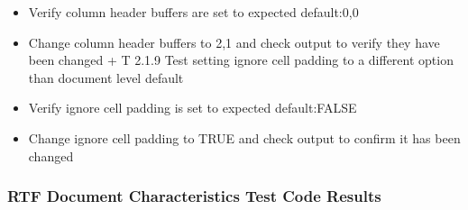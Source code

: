 \documentclass[]{article}
\providecommand{\tightlist}{%
  \setlength{\itemsep}{0pt}\setlength{\parskip}{0pt}}
\begin{document}
\begin{itemize}
\begin{itemize}
\begin{itemize}
      \begin{itemize}
      \tightlist
      \item
        Verify column header buffers are set to expected default:0,0
      \item
        Change column header buffers to 2,1 and check output to verify
        they have been changed + T 2.1.9 Test setting ignore cell
        padding to a different option than document level default
      \item
        Verify ignore cell padding is set to expected default:FALSE
      \item
        Change ignore cell padding to TRUE and check output to confirm
        it has been changed
      \end{itemize}
    \end{itemize}
  \end{itemize}
\end{itemize}

\hypertarget{rtf-document-characteristics-test-code-results}{%
\subsubsection{RTF Document Characteristics Test Code
Results}\label{rtf-document-characteristics-test-code-results}}
\end{document}
